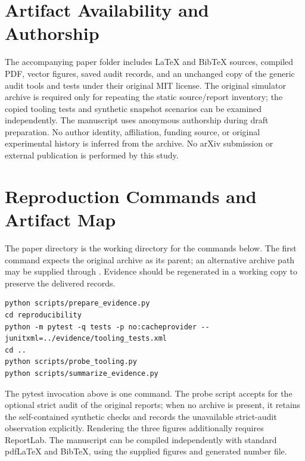 \documentclass[11pt,a4paper]{article}
\begin{document}
\section*{Artifact Availability and Authorship}
The accompanying paper folder includes LaTeX and BibTeX sources, compiled PDF, vector figures, saved audit records, and an unchanged copy of the generic audit tools and tests under their original MIT license. The original simulator archive is required only for repeating the static source/report inventory; the copied tooling tests and synthetic snapshot scenarios can be examined independently. The manuscript uses anonymous authorship during draft preparation. No author identity, affiliation, funding source, or original experimental history is inferred from the archive. No arXiv submission or external publication is performed by this study.




\appendix
\section{Reproduction Commands and Artifact Map}
\label{app:commands}
The paper directory is the working directory for the commands below. The first command expects the original archive as its parent; an alternative archive path may be supplied through . Evidence should be regenerated in a working copy to preserve the delivered records.

\begin{lstlisting}[basicstyle=\small\ttfamily,columns=fullflexible,keepspaces=true,breaklines=true,breakatwhitespace=true]
python scripts/prepare_evidence.py
cd reproducibility
python -m pytest -q tests -p no:cacheprovider --junitxml=../evidence/tooling_tests.xml
cd ..
python scripts/probe_tooling.py
python scripts/summarize_evidence.py
\end{lstlisting}
The pytest invocation above is one command. The probe script accepts  for the optional strict audit of the original reports; when no archive is present, it retains the self-contained synthetic checks and records the unavailable strict-audit observation explicitly. Rendering the three figures additionally requires ReportLab. The manuscript can be compiled independently with standard pdfLaTeX and BibTeX, using the supplied figures and generated number file.
\end{document}
